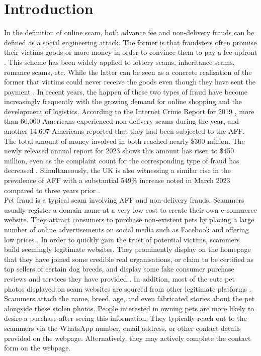 \documentclass[ oneside,%
                    author={Cassie Qing Tang},
                    degree={BSc},
                     title={An Automated Response System for Disrupting Online Pet Scamming \\ },
                    subtitle={ }]{dissertation}
\begin{document}
\mainmatter

\chapter{Introduction}
\label{chap:context}
In the definition of online scam, both advance fee and non-delivery frauds can be defined as a social engineering attack. The former is that fraudsters often promise their victims goods or more money in order to convince them to pay a fee upfront \cite{claude_toward_2014}. This scheme has been widely applied to lottery scams, inheritance scams, romance scams, etc. While the latter can be seen as a concrete realisation of the former that victims could never receive the goods even though they have sent the payment \cite{whittaker_understanding_2020}. In recent years, the happen of these two types of fraud have become increasingly frequently with the growing demand for online shopping and the development of logistics. According to the Internet Crime Report for 2019 \cite{noauthor_2019_nodate}, more than 60,000 Americans experienced non-delivery scams during the year, and another 14,607 Americans reported that they had been subjected to the AFF. The total amount of money involved in both reached nearly \$300 million. The newly released annual report for 2023 shows this amount has risen to \$450 million, even as the complaint count for the corresponding type of fraud has decreased \cite{noauthor_2023_nodate}. Simultaneously, the UK is also witnessing a similar rise in the prevalence of AFF with a substantial 549\% increase noted in March 2023 compared to three years prior \cite{stripe_crime_2023}. 
\\

Pet fraud is a typical scam involving AFF and non-delivery frauds. Scammers usually register a domain name at a very low cost to create their own e-commerce website. They attract consumers to purchase non-existent pets by placing a large number of online advertisements on social media such as Facebook and offering low prices \cite{price_resource_2020}. In order to quickly gain the trust of potential victims, scammers build seemingly legitimate websites. They prominently display on the homepage that they have joined some credible real organisations, or claim to be certified as top sellers of certain dog breeds, and display some fake consumer purchase reviews and services they have provided \cite{price_resource_2020}. In addition, most of the cute pet photos displayed on scam websites are sourced from other legitimate platforms \cite{better_business_bureau_bbb_2017}. Scammers attach the name, breed, age, and even fabricated stories about the pet alongside these stolen photos. People interested in owning pets are more likely to desire a purchase after seeing this information. They typically reach out to the scammers via the WhatsApp number, email address, or other contact details provided on the webpage. Alternatively, they may actively complete the contact form on the webpage.
\\
\end{document}
